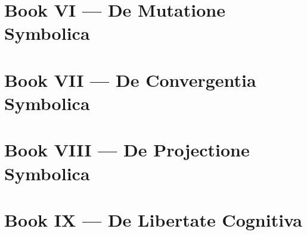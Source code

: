 \documentclass[11pt]{book}
\theoremstyle{definition}
\theoremstyle{remark}
\theoremstyle{remark} %
\theoremstyle{plain} %
\theoremstyle{remark}
\begin{document}
\chapter{Book VI — De Mutatione Symbolica}
\chapter{Book VII — De Convergentia Symbolica}
\chapter{Book VIII — De Projectione Symbolica}
\chapter{Book IX — De Libertate Cognitiva}
\cleardoublepage
%
\appendix
%

%

%

%

%


\end{document}

